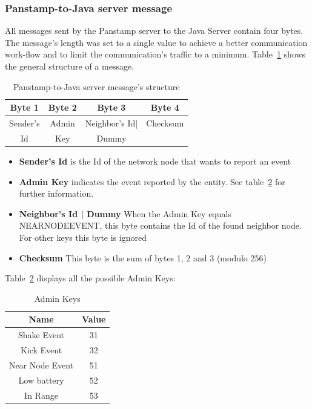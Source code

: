 \subsubsection{Panstamp-to-Java server message}
All messages sent by the Panstamp server to the Java Server contain four bytes. The message's length was set to a single value to achieve a better communication work-flow and to limit the communication's traffic to a minimum. Table~\ref{Panstamp-to-Java} shows the general structure of a message.


\begin{table}[h]
  \centering
  \begin{tabular}{ c | c | c | c }
    \hline
    \textbf{Byte 1} & \textbf{Byte 2} & \textbf{Byte 3} & \textbf{Byte 4} \\ [0.5ex]    
    \hline
    Sender's & Admin & Neighbor's Id| & Checksum  \\
    Id & Key & Dummy & \\
    \hline
  \end{tabular}
  \caption[Pamstamp-to-Java]%
          {Panstamp-to-Java server message's structure}
  \label{Panstamp-to-Java}
\end{table}

\begin{itemize}
\item \textbf{Sender's Id} is the Id of the network node that wants to report an event
\item \textbf{Admin Key} indicates the event reported by the entity. See table~\ref{Admin Keys} for further information.
\item \textbf {Neighbor's Id | Dummy } When the Admin Key equals NEARNODEEVENT, this byte contains the Id of the found neighbor node. For other keys this byte is ignored
\item \textbf {Checksum} This byte is the sum of bytes 1, 2 and 3 (modulo 256)
\end{itemize}

Table~\ref{Admin Keys} displays all the possible Admin Keys:

\begin{table}[h]
  \centering
  \begin{tabular}{ c | c }
    \hline
    \textbf{Name} & \textbf{Value}\\ [0.5ex]    
    \hline
    Shake Event & 31 \\
    Kick Event  & 32 \\
    Near Node Event & 51\\
    Low battery & 52\\
    In Range & 53\\   
    \hline
  \end{tabular}
  \caption[Admin Keys]%
          {Admin Keys}
  \label{Admin Keys}
\end{table}

